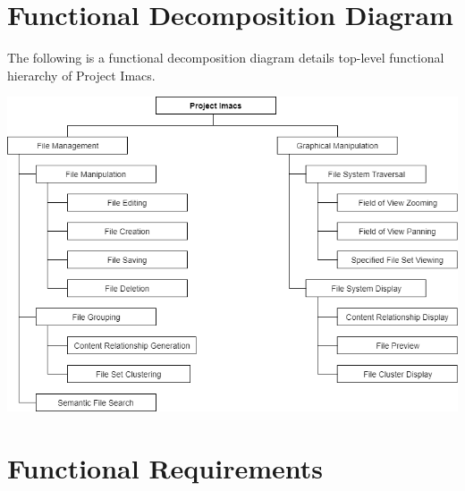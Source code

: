 \documentclass{article}
\begin{document}
\section{Functional Decomposition Diagram}
The following is a functional decomposition diagram details top-level functional hierarchy of Project Imacs.

\includegraphics[scale=0.5]{functional_decomposition_diagram.png}

\newpage
\section{Functional Requirements}
\end{document}
